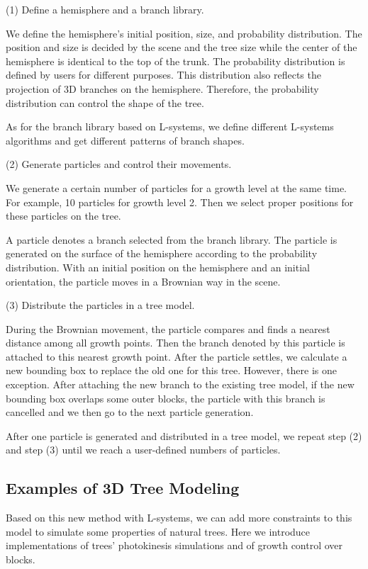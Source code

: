 (1)	Define a hemisphere and a branch library.

We define the hemisphere's initial position, size, and probability distribution. The position and size is decided by the scene and the tree size while the center of the hemisphere is identical to the top of the trunk. The probability distribution is defined by users for different purposes. This distribution also reflects the projection of 3D branches on the hemisphere. Therefore, the probability distribution can control the shape of the tree.

As for the branch library based on L-systems, we define different L-systems algorithms and get different patterns of branch shapes.

(2)	Generate particles and control their movements.

We generate a certain number of particles for a growth level at the same time. For example, 10 particles for growth level 2. Then we select proper positions for these particles on the tree.

A particle denotes a branch selected from the branch library. The particle is generated on the surface of the hemisphere according to the probability distribution. With an initial position on the hemisphere and an initial orientation, the particle moves in a Brownian way in the scene.

(3) Distribute the particles in a tree model.

During the Brownian movement, the particle compares and finds a nearest distance among all growth points. Then the branch denoted by this particle is attached to this nearest growth point. After the particle settles, we calculate a new bounding box to replace the old one for this tree. However, there is one exception. After attaching the new branch to the existing tree model, if the new bounding box overlaps some outer blocks, the particle with this branch is cancelled and we then go to the next particle generation. 

After one particle is generated and distributed in a tree model, we repeat step (2) and step (3) until we reach a user-defined numbers of particles. 

\subsection{Examples of 3D Tree Modeling}

Based on this new method with L-systems, we can add more constraints to this model to simulate some properties of natural trees. Here we introduce implementations of trees' photokinesis simulations and of growth control over blocks.


